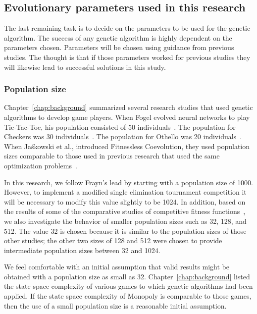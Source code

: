 \subsection{Evolutionary parameters used in this research}

The last remaining task is to decide on the parameters to be used for the
genetic algorithm. The success of any genetic algorithm is highly dependent on
the parameters chosen. Parameters will be chosen using guidance from previous
studies. The thought is that if those parameters worked for previous studies
they will likewise lead to successful solutions in this study.

\subsubsection{Population size}

Chapter~\ref{chap:background} summarized several research studies that used
genetic algorithms to develop game players. When Fogel evolved neural networks
to play Tic-Tac-Toe, his population consisted of 50
individuals~\cite{Fogel1993}. The population for Checkers was 30
individuals~\cite{Fogel2000Anaconda,journals/tec/ChellapillaF01}.
The population for Othello was 20 individuals~\cite{ChongTW05}. When
Ja\'{s}kowski et al., introduced Fitnessless Coevolution, they used population
sizes comparable to those used in previous research that used the same
optimization problems~\cite{Jaskowski:2008:FC:1389095.1389161}.

In this research, we follow Frayn's lead by starting with a population size of
1000. However, to implement a modified single elimination tournament competition
it will be necessary to modify this value slightly to be 1024. In addition,
based on the results of some of the comparative studies of competitive fitness
functions~\cite{Angeline:1993:CEE:645513.657590,Panait02acomparative,Jaskowski:2008:FC:1389095.1389161},
we also investigate the behavior of smaller population sizes such as 32, 128,
and 512. The value 32 is chosen because it is similar to the population sizes of
those other studies; the other two sizes of 128 and 512 were chosen to provide
intermediate population sizes between 32 and 1024.

We feel comfortable with an initial assumption that valid results might be
obtained with a population size as small as 32. Chapter~\ref{chap:background}
listed the state space complexity of various games to which genetic algorithms
had been applied. If the state space complexity of Monopoly is comparable to
those games, then the use of a small population size is a reasonable initial
assumption.

